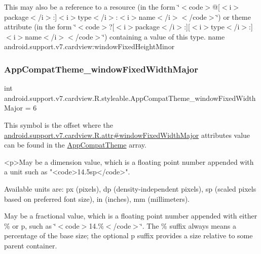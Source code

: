 This may also be a reference to a resource (in the form \char`\"{}$<$code$>$@\mbox{[}$<$i$>$package$<$/i$>$\+:\mbox{]}$<$i$>$type$<$/i$>$\+:$<$i$>$name$<$/i$>$$<$/code$>$\char`\"{}) or theme attribute (in the form \char`\"{}$<$code$>$?\mbox{[}$<$i$>$package$<$/i$>$\+:\mbox{]}\mbox{[}$<$i$>$type$<$/i$>$\+:\mbox{]}$<$i$>$name$<$/i$>$$<$/code$>$\char`\"{}) containing a value of this type.  name android.\+support.\+v7.\+cardview\+:window\+Fixed\+Height\+Minor \mbox{\label{classandroid_1_1support_1_1v7_1_1cardview_1_1R_1_1styleable_a37df104b2e08a0fd323610c8ceb0e98a}} 
\subsubsection{\texorpdfstring{App\+Compat\+Theme\+\_\+window\+Fixed\+Width\+Major}{AppCompatTheme\_windowFixedWidthMajor}}
{\footnotesize\ttfamily int android.\+support.\+v7.\+cardview.\+R.\+styleable.\+App\+Compat\+Theme\+\_\+window\+Fixed\+Width\+Major = 6\hspace{0.3cm}{\ttfamily [static]}}

This symbol is the offset where the \hyperlink{classandroid_1_1support_1_1v7_1_1cardview_1_1R_1_1attr_a6cdacbf4e2a2cbb70fdaf3d3a002e710}{android.\+support.\+v7.\+cardview.\+R.\+attr\#window\+Fixed\+Width\+Major} attribute\textquotesingle{}s value can be found in the \hyperlink{classandroid_1_1support_1_1v7_1_1cardview_1_1R_1_1styleable_a52e6f69f954ecc2622d72c0b4d298938}{App\+Compat\+Theme} array.

\begin{DoxyVerb}      <p>May be a dimension value, which is a floating point number appended with a unit such as "<code>14.5sp</code>".
\end{DoxyVerb}
 Available units are\+: px (pixels), dp (density-\/independent pixels), sp (scaled pixels based on preferred font size), in (inches), mm (millimeters). 

May be a fractional value, which is a floating point number appended with either \% or p, such as \char`\"{}$<$code$>$14.\%$<$/code$>$\char`\"{}. The \% suffix always means a percentage of the base size; the optional p suffix provides a size relative to some parent container. 

